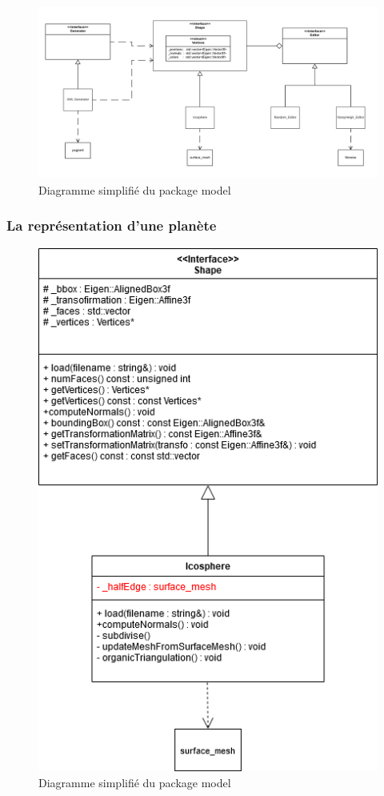 \documentclass[a4paper]{article}
\begin{document}
 \begin{figure}[!ht]
        \begin{center} \includegraphics[width=\linewidth]{img/archi/model.png}\end{center}
        \caption{\label{archi_model}Diagramme simplifié du package model}
    \end{figure}

\subsubsection{La représentation d'une planète}

 \begin{figure}[!ht]
        \begin{center} \includegraphics[width=0.5\linewidth]{img/archi/model_shape.png}\end{center}
        \caption{\label{archi_shape}Diagramme simplifié du package model}
    \end{figure}
    
\end{document}
